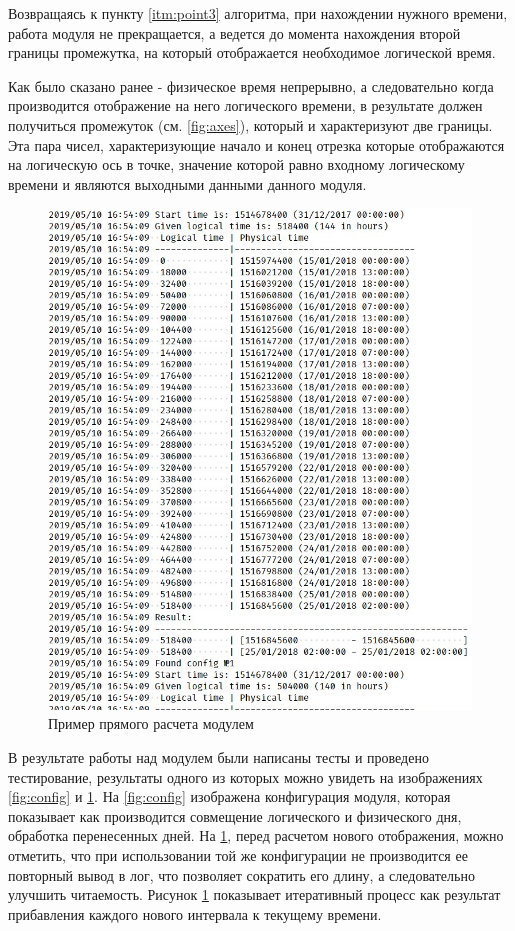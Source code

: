\indent Возвращаясь к пункту \ref{itm:point3} алгоритма, при нахождении нужного времени, работа модуля не прекращается, а ведется до момента нахождения второй границы промежутка, на который отображается необходимое логической время.

\indent Как было сказано ранее - физическое время непрерывно, а следовательно когда производится отображение на него логического времени, в результате должен получиться промежуток (см. \ref{fig:axes}), который и характеризуют две границы.
Эта пара чисел, характеризующие начало и конец отрезка которые отображаются на логическую ось в точке, значение которой равно входному логическому времени и являются выходными данными данного модуля.

\begin{figure}[ht]
	\centering
	\includegraphics[scale=0.6]{pics/scheduleEvalExample.png}
	\caption{Пример прямого расчета модулем}
	\label{fig:eval1}
\end{figure}

\indent В результате работы над модулем были написаны тесты и проведено тестирование, результаты одного из которых можно увидеть на изображениях \ref{fig:config} и \ref{fig:eval1}.
На \ref{fig:config} изображена конфигурация модуля, которая показывает как производится совмещение логического и физического дня, обработка перенесенных дней.
На \ref{fig:eval1}, перед расчетом нового отображения, можно отметить, что при использовании той же конфигурации не производится ее повторный вывод в лог, что позволяет сократить его длину, а следовательно улучшить читаемость.
Рисунок \ref{fig:eval1} показывает итеративный процесс как результат прибавления каждого нового интервала к текущему времени.

